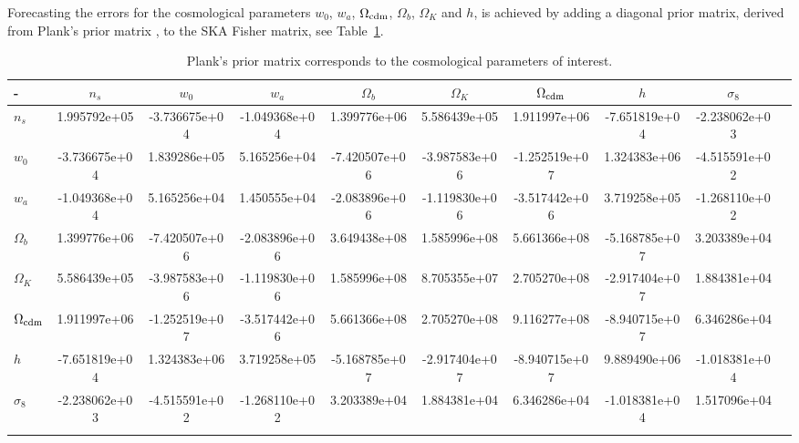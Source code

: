 \documentclass[useAMS,usenatbib]{mn2e}
\begin{document}
Forecasting the errors for  the cosmological parameters $w_0$, $w_a$, $\Omega_{\rm cdm}$, $\Omega_b$, $\Omega_K$ and $h$, is  achieved by adding a diagonal  prior matrix,  derived from Plank's prior matrix \citep{2013LRR....16....6A}, to the SKA Fisher matrix, see Table~\ref{tab:planck_prior}.


\begin{table}\label{tab:planck_prior}
\begin{tabular}{@{}lc|cccccccc}
\hline \hline
                        - &  $n_s$  &    $ w_0$                &         $ w_a$                &          $   \Omega_b$   &    $ \Omega_K $          &         $ \Omega_{\rm cdm} $    &$ h  $ &   $\sigma_8$  \\ \hline \hline 
              $n_s$    &  1.995792e+05 & -3.736675e+04 & -1.049368e+04   & 1.399776e+06
   & 5.586439e+05 &  1.911997e+06&  -7.651819e+04 & -2.238062e+03    \\
              $  w_0$ & -3.736675e+04 &  1.839286e+05 &  5.165256e+04  & -7.420507e+06
  & -3.987583e+06 & -1.252519e+07  & 1.324383e+06  & -4.515591e+02 \\
                $ w_a$& -1.049368e+04 &  5.165256e+04 &   1.450555e+04  & -2.083896e+06
  &  -1.119830e+06   & -3.517442e+06 &    3.719258e+05 & -1.268110e+02 \\
   $  \Omega_b$ & 1.399776e+06   &-7.420507e+06 &  -2.083896e+06 &  3.649438e+08
   & 1.585996e+08 &  5.661366e+08 &  -5.168785e+07 &  3.203389e+04  \\
     $\Omega_K $&  5.586439e+05  & -3.987583e+06 &  -1.119830e+06 &  1.585996e+08
  &  8.705355e+07 &  2.705270e+08 & -2.917404e+07 &  1.884381e+04 \\
    $ \Omega_{\rm cdm} $ &  1.911997e+06 & -1.252519e+07  & -3.517442e+06   & 5.661366e+08 &  2.705270e+08  & 9.116277e+08 & -8.940715e+07 &  6.346286e+04 \\
                  $  h$ &   -7.651819e+04  & 1.324383e+06 &  3.719258e+05  &-5.168785e+07
  & -2.917404e+07 & -8.940715e+07 &  9.889490e+06  & -1.018381e+04\\
  $\sigma_8$ & -2.238062e+03 & -4.515591e+02 &  -1.268110e+02 &  3.203389e+04
   & 1.884381e+04 &  6.346286e+04  & -1.018381e+04 &  1.517096e+04\\
   \\
\hline
\end{tabular}

\caption{Plank's prior matrix corresponds to the cosmological parameters of interest.}
\end{table}
\end{document}
